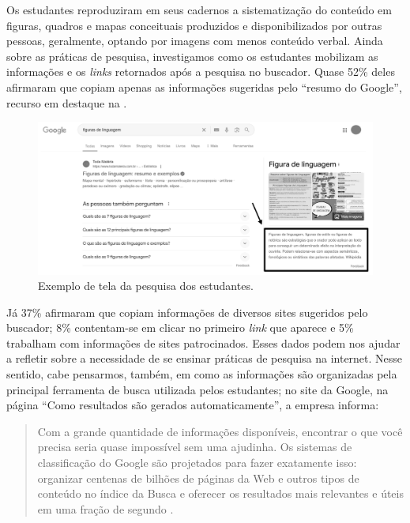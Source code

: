 \documentclass[portuguese]{textolivre}
\begin{document}
Os estudantes reproduziram em seus cadernos a sistematização do conteúdo em figuras, quadros e mapas conceituais produzidos e disponibilizados por outras pessoas, geralmente, optando por imagens com menos conteúdo verbal.
Ainda sobre as práticas de pesquisa, investigamos como os estudantes mobilizam as informações e os \textit{links} retornados após a pesquisa no buscador. Quase 52\% deles afirmaram que copiam apenas as informações sugeridas pelo ``resumo do Google'', recurso em destaque na . 

\begin{figure}
\centering
\begin{minipage}{\linewidth}
\includegraphics[width=\linewidth]{Fig2.png}
\caption{Exemplo de tela da pesquisa dos estudantes.}
\label{fig4}
\end{minipage}
\end{figure}

Já 37\% afirmaram que copiam informações de diversos sites sugeridos pelo buscador; 8\% contentam-se em clicar no primeiro \textit{link} que aparece e 5\% trabalham com informações de sites patrocinados. Esses dados podem nos ajudar a refletir sobre a necessidade de se ensinar práticas de pesquisa na internet. Nesse sentido, cabe pensarmos, também, em como as informações são organizadas pela principal ferramenta de busca utilizada pelos estudantes; no site da Google, na página ``Como resultados são gerados automaticamente'', a empresa informa:

\begin{quote}
    Com a grande quantidade de informações disponíveis, encontrar o que você precisa seria quase impossível sem uma ajudinha. Os sistemas de classificação do Google são projetados para fazer exatamente isso: organizar centenas de bilhões de páginas da Web e outros tipos de conteúdo no índice da Busca e oferecer os resultados mais relevantes e úteis em uma fração de segundo \cite{google_como_nodate}.
\end{quote}
\end{document}
